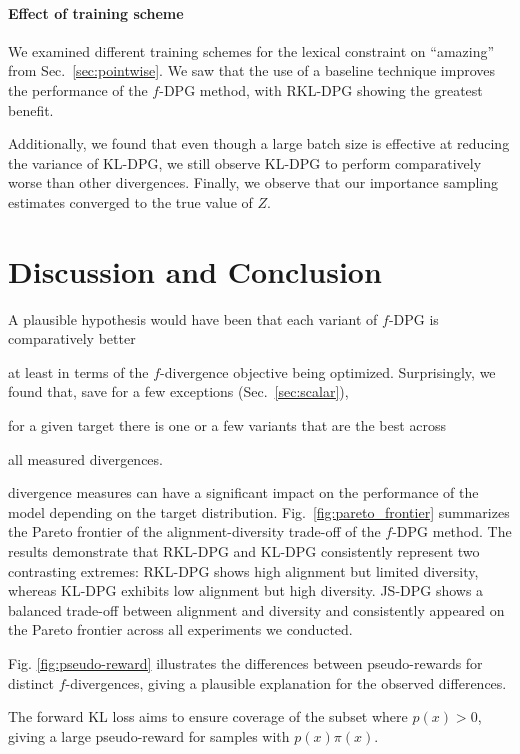 \paragraph{Effect of training scheme} {We examined different training schemes for the lexical constraint on ``amazing'' from Sec.~\ref{sec:pointwise}}. 
{We saw} that the use of a baseline technique improve{s} the performance of the $f$-DPG method, with RKL-DPG showing the greatest benefit. 

Additionally, we found that {even though} a large batch size {is effective at reducing the variance of KL-DPG, we still observe KL-DPG to perform comparatively worse than other divergences. } {Finally, we observe that our } {importance sampling estimates} converged to the true value of $Z$.

\section{Discussion {and Conclusion}}\label{sec:reward_comparision}

{A plausible hypothesis would have been} that each variant of $f$-DPG {is} comparatively better 

{at least} in terms of the $f$-divergence {objective} being optimized. {Surprisingly, we found that, save for a few exceptions (Sec.~\ref{sec:scalar}),}

for a given target there is one or a few variants that are the best {across}

all measured divergences.

divergence measures can have a significant impact on the performance of the model {depending on the target distribution}.
Fig.~\ref{fig:pareto_frontier} summarizes the Pareto frontier of the alignment-diversity trade-off of the $f$-DPG method. The results demonstrate that RKL-DPG and KL-DPG consistently represent two contrasting extremes: RKL-DPG shows high alignment but limited diversity, whereas KL-DPG exhibits low alignment but high diversity. JS-DPG shows a balanced trade-off between alignment and diversity and consistently appeared on the Pareto frontier across all experiments we conducted.

Fig. \ref{fig:pseudo-reward} illustrates the {differences between} pseudo-rewards for {distinct} $f$-divergences, giving a plausible explanation for the observed differences.

The forward KL loss aims to ensure coverage of the subset where $p(x)>0$, {giving} a large pseudo-reward for samples with $p(x)
\pi{(x)}$.

